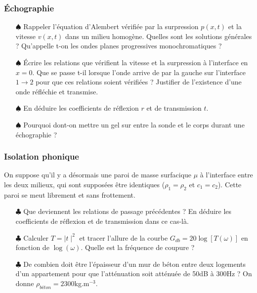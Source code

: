 \documentclass{report}
\begin{document}
\subsubsection*{Échographie}

\begin{itemize}
	
	\item[$\spadesuit$] Rappeler l'équation d'Alembert vérifiée par la surpression $p(x,t)$ et la vitesse $v(x,t)$ dans un milieu homogène. Quelles sont les solutions générales ? Qu'appelle t-on les ondes planes progressives monochromatiques ?	
	
	\item[$\spadesuit$] Écrire les relations que vérifient la vitesse et la surpression à l'interface en $x=0$. Que se passe t-il lorsque l'onde arrive de par la gauche sur l'interface $1\longrightarrow2$ pour que ces relations soient vérifiées ? Justifier de l'existence d'une onde réfléchie et transmise.
	
	\item[$\spadesuit$] En déduire les coefficients de réflexion $r$ et de transmission $t$.
	
	\item[$\spadesuit$] Pourquoi dont-on mettre un gel sur entre la sonde et le corps durant une échographie ? 
		
\end{itemize}

\subsubsection*{Isolation phonique}

On suppose qu'il y a désormais une paroi de masse surfacique $\mu$ à l'interface entre les deux milieux, qui sont supposées être identiques ($\rho_1=\rho_2$ et $c_1=c_2$). Cette paroi se meut librement et sans frottement. 

\begin{itemize}
	
	\item[$\clubsuit$] Que deviennent les relations de passage précédentes ? En déduire les coefficients de réflexion et de transmission dans ce cas-là. 
	
	\item[$\clubsuit$] Calculer $T=\mid t\mid^2$ et tracer l'allure de la courbe $G_{db}=20\log\left[T(\omega) \right]$ en fonction de $\log(\omega)$. Quelle est la fréquence de coupure ?
	
	\item[$\clubsuit$] De combien doit être l'épaisseur d'un mur de béton entre deux logements d'un appartement pour que l'atténuation soit atténuée de 50dB à 300Hz ? On donne $\rho_{béton}=2300$kg.m$^{-3}$. 
	
\end{itemize}
\end{document}
